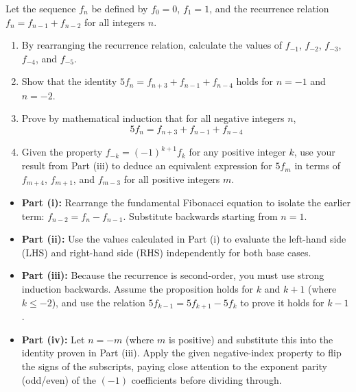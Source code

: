 \begin{problem}
Let the sequence $f_n$ be defined by $f_0 = 0$, $f_1 = 1$, and the recurrence relation $f_n = f_{n-1} + f_{n-2}$ for all integers $n$. 

\begin{enumerate}
    \item[(i)] By rearranging the recurrence relation, calculate the values of $f_{-1}$, $f_{-2}$, $f_{-3}$, $f_{-4}$, and $f_{-5}$.
    \item[(ii)] Show that the identity $5f_n = f_{n+3} + f_{n-1} + f_{n-4}$ holds for $n = -1$ and $n = -2$.
    \item[(iii)] Prove by mathematical induction that for all negative integers $n$, 
    \[ 5f_n = f_{n+3} + f_{n-1} + f_{n-4} \]
    \item[(iv)] Given the property $f_{-k} = (-1)^{k+1}f_k$ for any positive integer $k$, use your result from Part (iii) to deduce an equivalent expression for $5f_m$ in terms of $f_{m+4}$, $f_{m+1}$, and $f_{m-3}$ for all positive integers $m$.
\end{enumerate}
\end{problem}
\begin{hint}
\begin{itemize}
    \item \textbf{Part (i):} Rearrange the fundamental Fibonacci equation to isolate the earlier term: $f_{n-2} = f_n - f_{n-1}$. Substitute backwards starting from $n=1$.
    \item \textbf{Part (ii):} Use the values calculated in Part (i) to evaluate the left-hand side (LHS) and right-hand side (RHS) independently for both base cases. 
    \item \textbf{Part (iii):} Because the recurrence is second-order, you must use strong induction backwards. Assume the proposition holds for $k$ and $k+1$ (where $k \le -2$), and use the relation $5f_{k-1} = 5f_{k+1} - 5f_k$ to prove it holds for $k-1$. 
    \item \textbf{Part (iv):} Let $n = -m$ (where $m$ is positive) and substitute this into the identity proven in Part (iii). Apply the given negative-index property to flip the signs of the subscripts, paying close attention to the exponent parity (odd/even) of the $(-1)$ coefficients before dividing through.
\end{itemize}
\end{hint}
